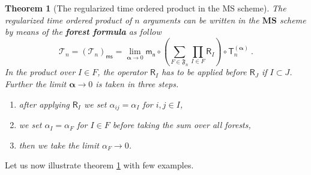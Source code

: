 \documentclass[11pt]{book}
\newcommand{\ms}{\mathsf{ms}}
\newcommand{\MS}{\textbf{MS}}
\newcommand{\alphabd}{\boldsymbol{\alpha}}
\newcommand{\Tcal}{\mathcal{T}}
\newcommand{\Frak}{\mathfrak{F}}
\newcommand{\Rsf}{\mathsf{R}}
\newcommand{\Tsf}{\mathsf{T}}
\newcommand{\msf}{\mathsf{m}}
\newcommand{\nsf}{\mathsf{n}}
\theoremstyle{break}
\newtheorem{theorem}{Theorem}[chapter]
\begin{document}
\begin{theorem}[The regularized time ordered product in the MS scheme] \label{theo:renorm_t_prod_ms_forest}
The regularized time ordered product of $n$ arguments can be written in the $\MS$ scheme by means of the \textbf{forest formula} as follow
%
\begin{equation}
\Tcal_n = \left(\Tcal_n\right)_\ms = \lim_{\alphabd \to 0} \msf_\nsf \circ \left( \sum_{F\in\Frak_{\overline{n}}} \prod_{I\in F} \Rsf_I \right) \circ \Tsf^{(\alphabd)}_n \ .
\label{eq:ms_t_forest}
\end{equation}
%
In the product over $I\in F$, the operator $\Rsf_I$ has to be applied before $\Rsf_J$ if $I\subset J$. Further the limit $\alphabd \to 0$ is taken in three steps. 
%
\begin{enumerate}
\item after applying $\Rsf_I$ we set $\alpha_{ij}=\alpha_I$ for $i,j\in I$,
%
\item we set $\alpha_{I} = \alpha_F$ for $I \in F$ before taking the sum over all forests,
%
\item then we take the limit $\alpha_F \to 0$.
\end{enumerate}
%
%
\end{theorem}


Let us now illustrate theorem \ref{theo:renorm_t_prod_ms_forest} with few examples.
\end{document}
